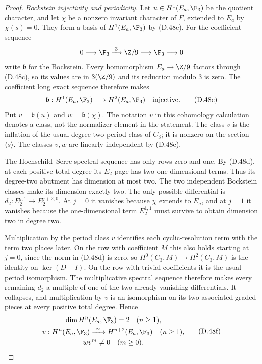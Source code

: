 \begin{proof}
\emph{Bockstein injectivity and periodicity.}
Let $u\in H^1(E_a,\F_3)$ be the quotient character,
and let $\chi$ be a nonzero invariant character of
$F$, extended to $E_a$ by $\chi(s)=0$.
They form a basis of $H^1(E_a,\F_3)$ by (D.48c).
For the coefficient sequence
\[
              0\longrightarrow\F_3
                 \xrightarrow{\;3\;}\Z/9
                 \longrightarrow\F_3\longrightarrow0
\]
write $\mathfrak b$ for the Bockstein.
Every homomorphism $E_a\to\Z/9$ factors through
(D.48c), so its values are in $3(\Z/9)$ and its
reduction modulo $3$ is zero.
The coefficient long exact sequence therefore makes
\[
     \mathfrak b:H^1(E_a,\F_3)\longrightarrow
                              H^2(E_a,\F_3)
                  \quad\hbox{injective}.                \tag{D.48e}
\]
Put $v=\mathfrak b(u)$ and $w=\mathfrak b(\chi)$.
The notation $v$ in this cohomology calculation
denotes a class, not the normalizer element in the
statement.
The class $v$ is the inflation of the usual degree-two
period class of $C_3$; it is nonzero on the section
$\langle s\rangle$.
The classes $v,w$ are linearly independent by
(D.48e).

The Hochschild--Serre spectral sequence has only
rows zero and one.  By (D.48d), at each positive
total degree its $E_2$ page has two
one-dimensional terms.  Thus its degree-two
abutment has dimension at most two.
The two independent Bockstein classes make its
dimension exactly two.
The only possible differential is
$d_2:E_2^{j,1}\to E_2^{j+2,0}$.
At $j=0$ it vanishes because $\chi$ extends to
$E_a$, and at $j=1$ it vanishes because the
one-dimensional term $E_2^{1,1}$ must survive
to obtain dimension two in degree two.

Multiplication by the period class $v$ identifies
each cyclic-resolution term with the term two
places later.
On the row with coefficient $M$ this also holds
starting at $j=0$, since the norm in (D.48d) is
zero, so $H^0(C_3,M)\to H^2(C_3,M)$ is the identity
on $\ker(D-I)$.
On the row with trivial coefficients it is the
usual period isomorphism.
The multiplicative spectral sequence therefore
makes every remaining $d_2$ a multiple of one of
the two already vanishing differentials.
It collapses, and multiplication by $v$ is an
isomorphism on its two associated graded pieces
at every positive total degree.  Hence
\[
 \begin{gathered}
        \dim H^n(E_a,\F_3)=2\quad(n\geq1),\\
        v:H^n(E_a,\F_3)\xrightarrow{\ \sim\ }
                             H^{n+2}(E_a,\F_3)
                       \quad(n\geq1),\\
                         wv^m\ne0\quad(m\geq0).
 \end{gathered}                                         \tag{D.48f}
\]


\end{proof}
